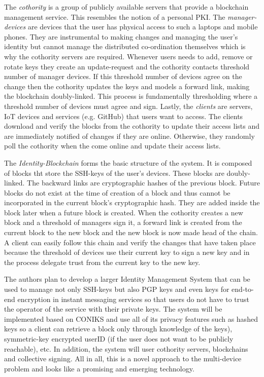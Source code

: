 The \textit{cothority} is a group of publicly available servers that provide a blockchain management service. This resembles the notion of a personal PKI. The \textit{manager-devices} are devices that the user has physical access to such a laptops and mobile phones. They are instrumental to making changes and managing the user's identity but cannot manage the distributed co-ordination themselves which is why the cothority servers are required. Whenever users needs to add, remove or rotate keys they create an update-request and the cothority contacts  threshold number of manager devices. If this threshold number of devices agree on the change then the cothority updates the keys and models a forward link, making the blockchain doubly-linked. This process is fundamentally thresholding where a threshold number of devices must agree and sign. Lastly, the \textit{clients} are servers, IoT devices and services (e.g. GitHub) that users want to access. The clients download and verify the blocks from the cothority to update their access lists and are immediately notified of changes if they are online. Otherwise, they randomly poll the cothority when the come online and update their access lists.

The \textit{Identity-Blockchain} forms the basic structure of the system. It is composed of blocks tht store the SSH-keys of the user's devices. These blocks are doubly-linked. The backward links are cryptographic hashes of the previous block. Future blocks do not exist at the time of creation of a block and thus cannot be incorporated in the current block's cryptographic hash. They are added inside the block later when a future block is created. When the cothority creates a new block and a threshold of managers sign it, a forward link is created from the current block to the new block and the new block is now made head of the chain. A client can easily follow this chain and verify the changes that have taken place because the threshold of devices use their current key to sign a new key and in the process delegate trust from the current key to the new key.

The authors plan to develop a larger Identity Management System that can be used to manage not only SSH-keys but also PGP keys and even keys for end-to-end encryption in instant messaging services so that users do not have to trust the operator of the service with their private keys. The system will be implemented based on CONIKS and use all of its privacy features such as hashed keys so a client can retrieve a block only through knowledge of the keys), symmetric-key encrypted userID (if the user does not want to be publicly reachable), etc. In addition, the system will user cothority servers, blockchains and collective signing. All in all, this is a novel approach to the multi-device problem and looks like a promising and emerging technology.


